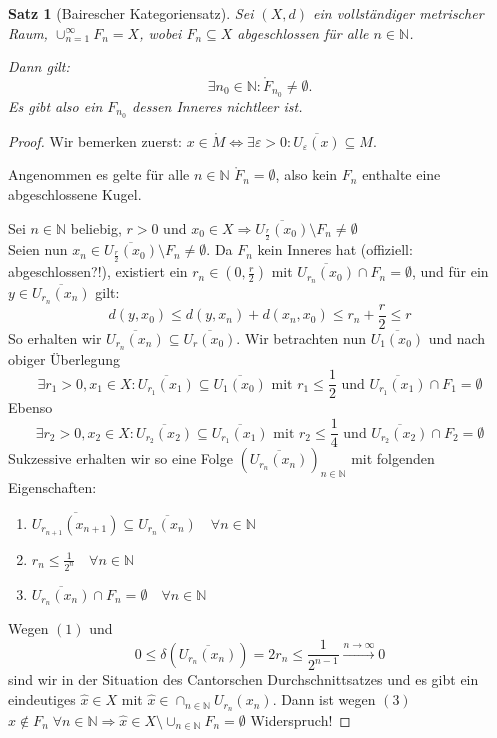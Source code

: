 \documentclass[ngerman]{report}
\theoremstyle{plain}%
\newtheorem{thm}{Satz}[chapter]
\theoremstyle{definition}%
\theoremstyle{myStyle}
\newcommand{\N}{\mathbb{N}}
\newcommand{\df}[1][]{%
	\overset{#1}{\Rightarrow}
}
\begin{document}
\begin{thm}[Bairescher Kategoriensatz]
	Sei $(X,d)$ ein vollständiger metrischer Raum, $\cup^\infty_{n=1} F_n = X$, wobei $F_n \subseteq X$ abgeschlossen für alle $n\in\N$.\par
	Dann gilt: $$\exists n_0\in\N:\mathring F_{n_0} \not = \emptyset.$$ Es gibt also ein $F_{n_0}$ dessen Inneres nichtleer ist.
\end{thm}
\begin{proof}
	Wir bemerken zuerst: $x\in\mathring M \Leftrightarrow \exists \varepsilon >0: \overline{U_\varepsilon (x)} \subseteq M$.\par 
	Angenommen es gelte für alle $n\in\N$ $\mathring F_n = \emptyset$, also kein $F_n$ enthalte eine abgeschlossene Kugel.\par 
	Sei $n\in\N$ beliebig, $r>0$ und $x_0\in X \df \overline{U_{\frac{r}{2}}(x_0)}\setminus F_n \not = \emptyset $\\
	Seien nun $x_n \in \overline{U_{\frac{r}{2}}(x_0)}\setminus F_n \not = \emptyset$. 	
	Da $F_n$ kein Inneres hat (offiziell: abgeschlossen?!), existiert ein $r_n \in (0,\frac{r}{2})$ mit $\overline{U_{r_n}(x_0)}\cap F_n = \emptyset$, 
	und für ein $y\in \overline{U_{r_n}(x_n)}$ gilt:
	$$d(y,x_0) \leq d(y,x_n) + d(x_n, x_0) \leq r_n + \frac{r}{2} \leq r $$
	So erhalten wir $\overline{U_{r_n}(x_n)} \subseteq \overline{U_r(x_0)}$.
	Wir betrachten nun $\overline{U_1(x_0)}$ und nach obiger Überlegung
	$$\exists r_1 > 0, x_1 \in X: \overline{U_{r_1} (x_1)} \subseteq \overline{U_1(x_0)} \text{ mit } r_1 \leq \frac{1}{2} \text{ und } \overline{U_{r_1}(x_1)} \cap F_1 = \emptyset$$
	Ebenso
	$$\exists r_2 > 0, x_2 \in X: \overline{U_{r_2} (x_2)} \subseteq \overline{U_{r_1}(x_1)} \text{ mit } r_2 \leq \frac{1}{4} \text{ und } \overline{U_{r_2}(x_2)} \cap F_2 = \emptyset$$
	Sukzessive erhalten wir so eine Folge $\left( \overline{U_{r_n}(x_n)}\right)_{n\in\N}$ mit folgenden Eigenschaften:
	\begin{enumerate}[(1)]
		\item $\overline{U_{r_{n+1}} (x_{n+1})} \subseteq \overline{U_{r_n}(x_n)} \quad \forall n\in\N$
		
		\item $r_n \leq \frac{1}{2^n}\quad \forall n\in\N$
		
		\item $\overline{U_{r_n}(x_n)} \cap F_n = \emptyset\quad \forall n\in\N$
	\end{enumerate}
	Wegen $(1)$ und $$0 \leq \delta\left(\overline{U_{r_n}(x_n)}\right) = 2r_n \leq \frac{1}{2^{n-1}}\overset{n\to\infty}{\longrightarrow}0$$
	sind wir in der Situation des Cantorschen Durchschnittsatzes und es gibt ein eindeutiges $\hat{x} \in X$ mit $\hat{x}\in \cap_{n\in\N} U_{r_n}(x_n)$.
	Dann ist wegen $(3)$ $\hat{x} \not \in F_n\; \forall n\in\N \df \hat{x}\in X \setminus \cup_{n\in\N} F_n = \emptyset$ Widerspruch!
\end{proof}
\end{document}
